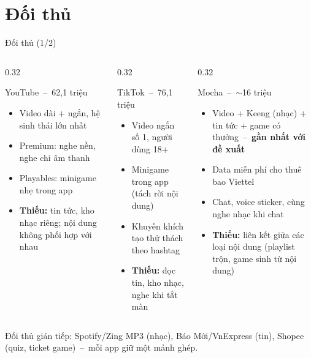 \documentclass[aspectratio=169]{beamer}
\begin{document}
\section{Đối thủ}
\begin{frame}{Đối thủ (1/2)}
  \begin{columns}
    \begin{column}{0.32\textwidth}
      \begin{block}{\small YouTube~--~62,1 triệu}
        \scriptsize
        \begin{itemize}
          \item Video dài + ngắn, hệ sinh thái lớn nhất
          \item Premium: nghe nền, nghe chỉ âm thanh
          \item Playables: minigame nhẹ trong app
          \item \textbf{Thiếu:} tin tức, kho nhạc riêng; nội dung không phối hợp với nhau
        \end{itemize}
      \end{block}
    \end{column}
    \begin{column}{0.32\textwidth}
      \begin{block}{\small TikTok~--~76,1 triệu}
        \scriptsize
        \begin{itemize}
          \item Video ngắn số 1, người dùng 18+
          \item Minigame trong app (tách rời nội dung)
          \item Khuyến khích tạo thử thách theo hashtag
          \item \textbf{Thiếu:} đọc tin, kho nhạc, nghe khi tắt màn
        \end{itemize}
      \end{block}
    \end{column}
    \begin{column}{0.32\textwidth}
      \begin{block}{\small Mocha~--~$\sim$16 triệu}
        \scriptsize
        \begin{itemize}
          \item Video + Keeng (nhạc) + tin tức + game có thưởng~--~\textbf{gần nhất với đề xuất}
          \item Data miễn phí cho thuê bao Viettel
          \item Chat, voice sticker, cùng nghe nhạc khi chat
          \item \textbf{Thiếu:} liên kết giữa các loại nội dung (playlist trộn, game sinh từ nội dung)
        \end{itemize}
      \end{block}
    \end{column}
  \end{columns}
  \vfill
  {\scriptsize\color{brandgray} Đối thủ gián tiếp: Spotify/Zing MP3 (nhạc), Báo Mới/VnExpress (tin), Shopee (quiz, ticket game)~--~mỗi app giữ một mảnh ghép.}
\end{frame}
\end{document}
